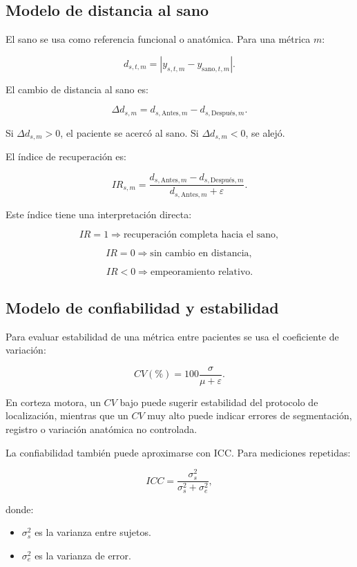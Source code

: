 \documentclass[12pt,a4paper]{article}
\begin{document}
\subsection{Modelo de distancia al sano}

El sano se usa como referencia funcional o anatómica. Para una métrica \(m\):

\[
d_{s,t,m}
=
|y_{s,t,m}-y_{\text{sano},t,m}|.
\]

El cambio de distancia al sano es:

\[
\Delta d_{s,m}
=
d_{s,\text{Antes},m}
-
d_{s,\text{Después},m}.
\]

Si \(\Delta d_{s,m}>0\), el paciente se acercó al sano. Si \(\Delta d_{s,m}<0\), se alejó.

El índice de recuperación es:

\[
IR_{s,m}
=
\frac{
d_{s,\text{Antes},m}
-
d_{s,\text{Después},m}
}
{
d_{s,\text{Antes},m}
+
\varepsilon
}.
\]

Este índice tiene una interpretación directa:

\[
IR=1
\Rightarrow
\text{recuperación completa hacia el sano},
\]

\[
IR=0
\Rightarrow
\text{sin cambio en distancia},
\]

\[
IR<0
\Rightarrow
\text{empeoramiento relativo}.
\]

\subsection{Modelo de confiabilidad y estabilidad}

Para evaluar estabilidad de una métrica entre pacientes se usa el coeficiente de variación:

\[
CV(\%)
=
100
\frac{\sigma}{\mu+\varepsilon}.
\]

En corteza motora, un \(CV\) bajo puede sugerir estabilidad del protocolo de localización, mientras que un \(CV\) muy alto puede indicar errores de segmentación, registro o variación anatómica no controlada.

La confiabilidad también puede aproximarse con ICC. Para mediciones repetidas:

\[
ICC
=
\frac{\sigma_s^2}
{\sigma_s^2+\sigma_e^2},
\]

donde:

\begin{itemize}
    \item \(\sigma_s^2\) es la varianza entre sujetos.
    \item \(\sigma_e^2\) es la varianza de error.
\end{itemize}
\end{document}
